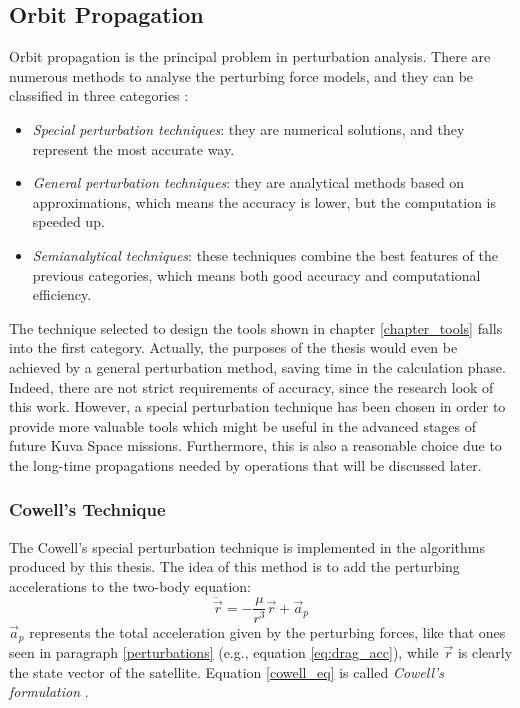 \subsection{Orbit Propagation} \label{orbit_prop_paragraph}
Orbit propagation is the principal problem in perturbation analysis.
There are numerous methods to analyse the perturbing force models, and they can be classified in three categories  \cite{vallado2013fundamentals}:
\begin{itemize}
    \item \textit{Special perturbation techniques}: they are numerical solutions, and they represent the most accurate way.
    \item \textit{General perturbation techniques}: they are analytical methods based on approximations, which means the accuracy is lower, but the computation is speeded up.
    \item \textit{Semianalytical techniques}: these techniques combine the best features of the previous categories, which means both good accuracy and computational efficiency.
\end{itemize}
The technique selected to design the tools shown in chapter \ref{chapter_tools} falls into the first category.
Actually, the purposes of the thesis would even be achieved by a general perturbation method, saving time in the calculation phase.
Indeed, there are not strict requirements of accuracy, since the research look of this work.
However, a special perturbation technique has been chosen in order to provide more valuable tools which might be useful in the advanced stages of future Kuva Space missions.
Furthermore, this is also a reasonable choice due to the long-time propagations needed by operations that will be discussed later.

\subsubsection{Cowell's Technique}
The Cowell's special perturbation technique is implemented in the algorithms produced by this thesis.
The idea of this method is to add the perturbing accelerations to the two-body equation:
\begin{equation} \label{cowell_eq}
    \ddot{\vec{r}} = - \frac{\mu}{r^3}\vec{r} + \vec{a}_p
\end{equation}
$\vec{a}_p$ represents the total acceleration given by the perturbing forces, like that ones seen in paragraph \ref{perturbations} (e.g., equation \ref{eq:drag_acc}), while $\vec{r}$ is clearly the state vector of the satellite.
Equation \ref{cowell_eq} is called \textit{Cowell's formulation} \cite{vallado2013fundamentals}.

